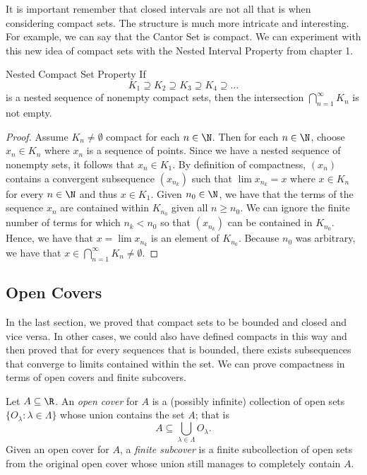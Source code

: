 It is important remember that closed intervals are not all that is when considering compact sets. The structure is much more intricate and interesting. For example, we can say that the Cantor Set is compact. We can experiment with this new idea of compact sets with the Nested Interval Property from chapter 1.


\begin{theorem}{Nested Compact Set Property}{}
    If 
    \[ K_1 \supseteq K_2 \supseteq K_3 \supseteq K_4 \supseteq \dots \]
    is a nested sequence of nonempty compact sets, then the intersection \( \bigcap_{ n=1 }^{ \infty  } K_n  \) is not empty.
    \end{theorem}

\begin{proof}
    Assume \( K_n \neq \emptyset  \) compact for each \( n \in \N \). Then for each \(  n \in \N \), choose \( x_n \in K_n \) where \( x_n \) is a sequence of points. Since we have a nested sequence of nonempty sets, it follows that \( x_n \in K_1 \). By definition of compactness, \( (x_n) \) contains a convergent subsequence \( (x_{n_k}) \) such that \( \lim x_{n_k} = x  \) where \( x \in K_n \) for every \( n \in \N \) and thus \( x \in K_1 \). Given \( n_0 \in \N \), we have that the terms of the sequence \( x_n  \) are contained within \( K_{n_0} \) given all \( n \geq n_0 \). We can ignore the finite number of terms for which \( n_k < n_0  \) so that \( (x_{n_k}) \) can be contained in \( K_{n_0} \). Hence, we have that \( x = \lim x_{n_k} \) is an element of \( K_{n_0} \). Because \( n_0  \) was arbitrary, we have that \( x \in \bigcap_{ n=1 }^{ \infty  } K_n \neq \emptyset\).
\end{proof}

\subsection{Open Covers}
In the last section, we proved that compact sets to be bounded and closed and vice versa. In other cases, we could also have defined compacts in this way and then proved that for every sequences that is bounded, there exists subsequences that converge to limits contained within the set. We can prove compactness in terms of open covers and finite subcovers. 

\begin{definition}{}{}
    Let \( A \subseteq \R \). An \textit{open cover} for \( A \) is a (possibly infinite) collection of open sets \( \{ O_{\lambda} : \lambda \in \Lambda \}  \) whose union contains the set \( A \); that is 
    \[ A \subseteq \bigcup_{ \lambda \in \Lambda } O_{\lambda}.  \]
    Given an open cover for \( A \), a \textit{finite subcover} is a finite subcollection of open sets from the original open cover whose union still manages to completely contain \( A \).
\end{definition}

